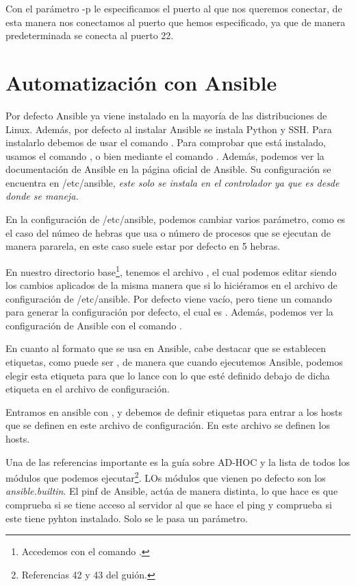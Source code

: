 Con el parámetro -p le especificamos el puerto al que nos queremos conectar, de esta manera nos conectamos al puerto que hemos especificado, ya que de manera predeterminada se conecta al puerto 22.

\section{Automatización con Ansible}

Por defecto Ansible ya viene instalado en la mayoría de las distribuciones de Linux. Además, por defecto al instalar Ansible se instala Python y SSH. Para instalarlo debemos de usar el comando . Para comprobar que está instalado, usamos el comando , o bien mediante el comando . Además, podemos ver la documentación de Ansible en la página oficial de Ansible. Su configuración se encuentra en /etc/ansible, \textit{este solo se instala en el controlador ya que es desde donde se maneja.}

En la configuración de /etc/ansible, podemos cambiar varios parámetro, como es el caso del númeo de hebras que usa o número de procesos que se ejecutan de manera pararela, en este caso suele estar por defecto en 5 hebras.

En nuestro directorio base\footnote{Accedemos con el comando .}, tenemos el archivo , el cual podemos editar siendo los cambios aplicados de la misma manera que si lo hiciéramos en el archivo de configuración de /etc/ansible. Por defecto viene vacío, pero tiene un comando para generar la configuración por defecto, el cual es . Además, podemos ver la configuración de Ansible con el comando .

En cuanto al formato que se usa en Ansible, cabe destacar que se establecen etiquetas, como puede ser , de manera que cuando ejecutemos Ansible, podemos elegir esta etiqueta para que lo lance con lo que esté definido debajo de dicha etiqueta en el archivo de configuración.

Entramos en ansible con , y debemos de definir etiquetas para entrar a los hosts que se definen en este archivo de configuración. En este archivo se definen los hosts. 

Una de las referencias importante es la guía sobre AD-HOC y la lista de todos los módulos que podemos ejecutar\footnote{Referencias 42 y 43 del guión.}. LOs módulos que vienen po defecto son los \textit{ansible.builtin}. El pinf de Ansible, actúa de manera distinta, lo que hace es que comprueba si se tiene acceso al servidor al que se hace el ping y comprueba si este tiene pyhton instalado. Solo se le pasa un parámetro.

